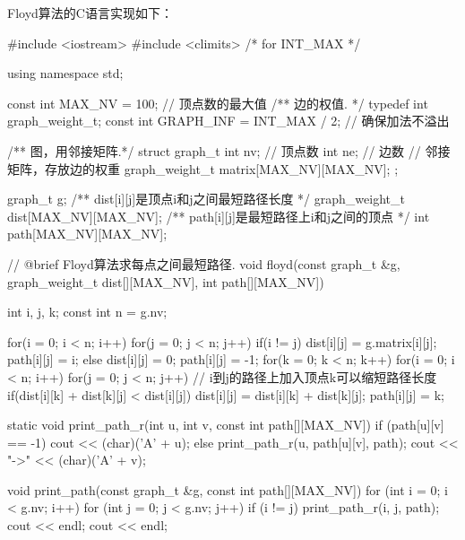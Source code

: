 Floyd算法的C语言实现如下：
\begin{Codex}[label=am_graph_floyd.cpp]
    #include <iostream>
    #include <climits>  /* for INT_MAX */

    using namespace std;

    const int MAX_NV = 100; // 顶点数的最大值
    /** 边的权值. */
    typedef int graph_weight_t;
    const int GRAPH_INF = INT_MAX / 2;   // 确保加法不溢出

    /** 图，用邻接矩阵.*/
    struct graph_t {
        int nv; // 顶点数
        int ne; // 边数
        // 邻接矩阵，存放边的权重
        graph_weight_t matrix[MAX_NV][MAX_NV];
    };

    graph_t g;
    /** dist[i][j]是顶点i和j之间最短路径长度 */
    graph_weight_t dist[MAX_NV][MAX_NV];
    /** path[i][j]是最短路径上i和j之间的顶点 */
    int path[MAX_NV][MAX_NV];


    // @brief Floyd算法求每点之间最短路径.
    void floyd(const graph_t &g,
           graph_weight_t dist[][MAX_NV],
           int path[][MAX_NV]) {
        int i, j, k;
        const int n = g.nv;

        for(i = 0; i < n; i++) {
            for(j = 0; j < n; j++) {
                if(i != j) {
                    dist[i][j] = g.matrix[i][j];
                    path[i][j] = i;
                } else {
                    dist[i][j] = 0;
                    path[i][j] = -1;
                }
            }
        }
        for(k = 0; k < n; k++) {
            for(i = 0; i < n; i++) {
                for(j = 0; j < n; j++) {
                    // i到j的路径上加入顶点k可以缩短路径长度
                    if(dist[i][k] + dist[k][j] < dist[i][j]) {
                        dist[i][j] = dist[i][k] + dist[k][j];
                        path[i][j] = k;
                    }
                }
            }
        }
    }

    static void print_path_r(int u, int v, const int path[][MAX_NV]) {
        if (path[u][v] == -1) {
            cout << (char)('A' + u);
        } else {
            print_path_r(u, path[u][v], path);
            cout << "->" << (char)('A' + v);
        }
    }

    void print_path(const graph_t &g, const int path[][MAX_NV]) {
        for (int i = 0; i < g.nv; i++) {
            for (int j = 0; j < g.nv; j++) {
                if (i != j) {
                    print_path_r(i, j, path);
                    cout << endl;
                }
            }
            cout << endl;
        }
    }


\end{Codex}
